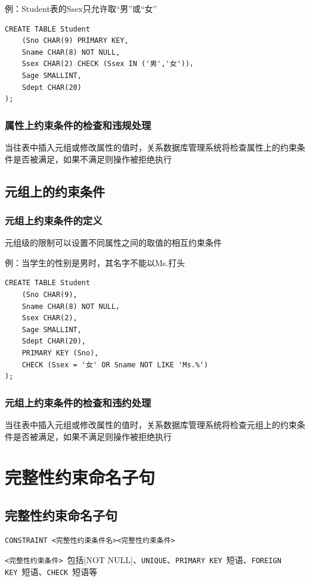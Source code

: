 例：Student表的Ssex只允许取“男”或“女”
\begin{lstlisting}
CREATE TABLE Student
	(Sno CHAR(9) PRIMARY KEY,
	Sname CHAR(8) NOT NULL,                     
	Ssex CHAR(2) CHECK (Ssex IN ('男','女'))，           
	Sage SMALLINT,
	Sdept CHAR(20)
);
\end{lstlisting}

\subsubsection{属性上约束条件的检查和违规处理}
当往表中插入元组或修改属性的值时，关系数据库管理系统将检查属性上的约束条件是否被满足，如果不满足则操作被拒绝执行

\subsection{元组上的约束条件}

\subsubsection{元组上约束条件的定义}
元组级的限制可以设置不同属性之间的取值的相互约束条件

例：当学生的性别是男时，其名字不能以Ms.打头
\begin{lstlisting}
CREATE TABLE Student
	(Sno CHAR(9), 
	Sname CHAR(8) NOT NULL，
	Ssex CHAR(2),
	Sage SMALLINT,
	Sdept CHAR(20),
	PRIMARY KEY (Sno),
	CHECK (Ssex = '女' OR Sname NOT LIKE 'Ms.%')
);
\end{lstlisting}

\subsubsection{元组上约束条件的检查和违约处理}
当往表中插入元组或修改属性的值时，关系数据库管理系统将检查元组上的约束条件是否被满足，如果不满足则操作被拒绝执行

\section{完整性约束命名子句}

\subsection{完整性约束命名子句}
\begin{lstlisting}
CONSTRAINT <完整性约束条件名><完整性约束条件>
\end{lstlisting}
\verb|<完整性约束条件>|\ 包括\sverb|NOT NULL|、\verb|UNIQUE|、\verb|PRIMARY KEY|\ 短语、\verb|FOREIGN KEY|\ 短语、\verb|CHECK|\ 短语等

